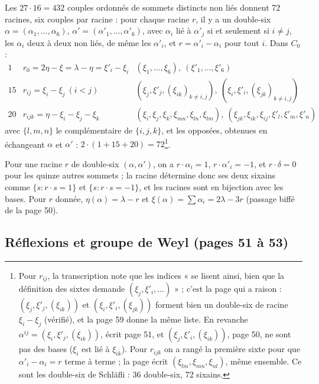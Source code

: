 \documentclass[11pt,a4paper]{article}
\begin{document}
Les $27 \cdot 16 = 432$ couples ordonnés de sommets distincts non liés donnent
72 racines, six couples par racine : pour chaque racine $r$, il y a un
double-six $\alpha = (\alpha_1, \ldots, \alpha_6)$, $\alpha' = (\alpha'_1,
\ldots, \alpha'_6)$, avec $\alpha_i$ lié à $\alpha'_j$ si et seulement si $i
\neq j$, les $\alpha_i$ deux à deux non liés, de même les $\alpha'_i$, et $r =
\alpha'_i - \alpha_i$ pour tout $i$. Dans $C_0$ :
\[
\begin{array}{lll}
1 & r_0 = 2\eta - \xi = \lambda - \eta = \xi'_i - \xi_i &
(\xi_1, \ldots, \xi_6), \ (\xi'_1, \ldots, \xi'_6) \\[3pt]
15 & r_{ij} = \xi_i - \xi_j \ (i < j) & (\xi_j, \xi'_j, (\xi_{ik})_{k \neq
i,j}), \ (\xi_i, \xi'_i, (\xi_{jk})_{k \neq i,j}) \\[3pt]
20 & r_{ijk} = \eta - \xi_i - \xi_j - \xi_k & (\xi_i, \xi_j, \xi_k,
\xi_{mn}, \xi_{ln}, \xi_{lm}), \ (\xi_{jk}, \xi_{ik}, \xi_{ij}, \xi'_l,
\xi'_m, \xi'_n)
\end{array}
\]
avec $\lbrace l, m, n\rbrace$ le complémentaire de $\lbrace i, j, k\rbrace$, et
les opposées, obtenues en échangeant $\alpha$ et $\alpha'$ : $2 \cdot (1 + 15
+ 20) = 72$\footnote{Pour $r_{ij}$, la transcription note que les indices
« se lisent ainsi, bien que la définition des sixtes demande $(\xi_j, \xi'_i,
\ldots)$ » ; c'est la page qui a raison : $(\xi_j, \xi'_j, (\xi_{ik}))$ et
$(\xi_i, \xi'_i, (\xi_{jk}))$ forment bien un double-six de racine $\xi_i -
\xi_j$ (vérifié), et la page 59 donne la même liste. En revanche
$\alpha^{ij} = (\xi_i, \xi'_j, (\xi_{ik}))$, écrit page 51, et $(\xi_j,
\xi'_i, (\xi_{ik}))$, page 50, ne sont pas des bases ($\xi_i$ est lié à
$\xi_{ik}$). Pour $r_{ijk}$ on a rangé la première sixte pour que $\alpha'_i -
\alpha_i = r$ terme à terme ; la page écrit $(\xi_{lm}, \xi_{mn}, \xi_{nl})$,
même ensemble. Ce sont les double-six de Schläfli : 36 double-six, 72
sixains.}.

Pour une racine $r$ de double-six $(\alpha, \alpha')$, on a $r \cdot \alpha_i =
1$, $r \cdot \alpha'_i = -1$, et $r \cdot \delta = 0$ pour les quinze autres
sommets ; la racine détermine donc ses deux sixains comme $\lbrace s : r \cdot s
= 1\rbrace$ et $\lbrace s : r \cdot s = -1\rbrace$, et les racines sont en
bijection avec les bases. Pour $r$ donnée, $\eta(\alpha) = \lambda - r$ et
$\xi(\alpha) = \sum \alpha_i = 2\lambda - 3r$ (passage biffé de la page 50).

\subsection*{Réflexions et groupe de Weyl (pages 51 à 53)}
\end{document}
